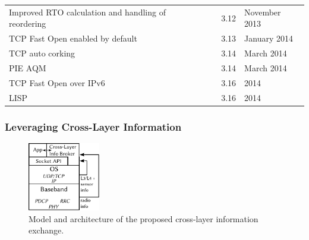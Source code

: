 \documentclass{beamer}
\begin{document}
\begin{frame}
\begin{tabu}{X[1.4]X[0.4]X[0.4]X[0.7]}
		Improved RTO calculation and handling of reordering & & 3.12 & November 2013 \\ %
		TCP Fast Open enabled by default & & 3.13 & January 2014 \\
		TCP auto corking & & 3.14 & March 2014 \\ %
		PIE AQM & & 3.14 & March 2014 \\ %
		TCP Fast Open over IPv6 & & 3.16 & 2014 \\
		LISP & \cite{rfc6830} & 3.16 & 2014 \\
		\bottomrule
		\end{tabu}
\end{frame}


\begin{frame}
	\frametitle{Leveraging Cross-Layer Information}

	\begin{figure}
		\centering
		\includegraphics[height=3cm]{../../chapters/05-mobilestreaming/images/cross-layer-model.pdf}
		\caption{Model and architecture of the proposed cross-layer information exchange.}
	\end{figure}
\end{frame}
\end{document}

